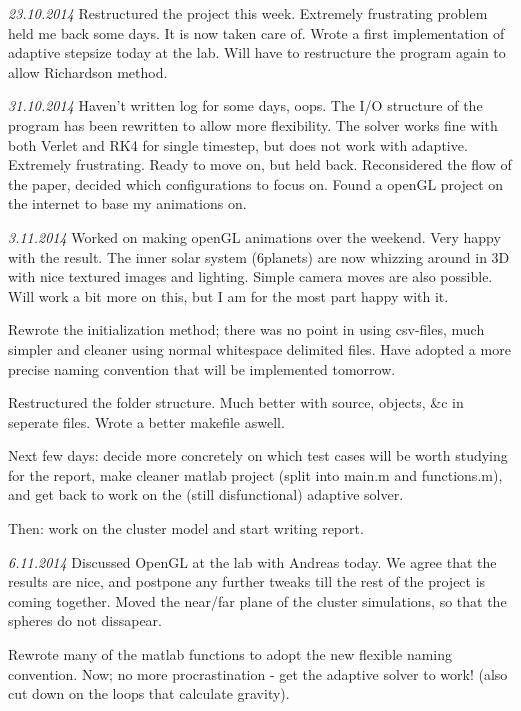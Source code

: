 \documentclass[11pt, oneside]{article}   	%
\begin{document}
\emph{23.10.2014}
Restructured the project this week. Extremely frustrating problem held me back some days. It is now taken care of. Wrote a first implementation of adaptive stepsize today at the lab. Will have to restructure the program again to allow Richardson method. 

\emph{31.10.2014}
Haven't written log for some days, oops. The I/O structure of the program has been rewritten to allow more flexibility. The solver works fine with both Verlet and RK4 for single timestep, but does not work with adaptive. Extremely frustrating. Ready to move on, but held back. Reconsidered the flow of the paper, decided which configurations to focus on. Found a openGL project on the internet to base my animations on.

\emph{3.11.2014}
Worked on making openGL animations over the weekend. Very happy with the result. The inner solar system (6planets) are now whizzing around in 3D with nice textured images and lighting. Simple camera moves are also possible. Will work a bit more on this, but I am for the most part happy with it. 

Rewrote the initialization method; there was no point in using csv-files, much simpler and cleaner using normal whitespace delimited files. Have adopted a more precise naming convention that will be implemented tomorrow. 

Restructured the folder structure. Much better with source, objects, \&c in seperate files. Wrote a better makefile aswell. 

Next few days: decide more concretely on which test cases will be worth studying for the report, make cleaner matlab project (split into main.m and functions.m), and get back  to work on the (still disfunctional) adaptive solver. 

Then: work on the cluster model and start writing report.  

\emph{6.11.2014}
Discussed OpenGL at the lab with Andreas today. We agree that the results are nice, and postpone any further tweaks till the rest of the project is coming together. Moved the near/far plane of the cluster simulations, so that the spheres do not dissapear. 

Rewrote many of the matlab functions to adopt the new flexible naming convention. Now; no more procrastination - get the adaptive solver to work! (also cut down on the loops that calculate gravity).


\newpage
\end{document}
